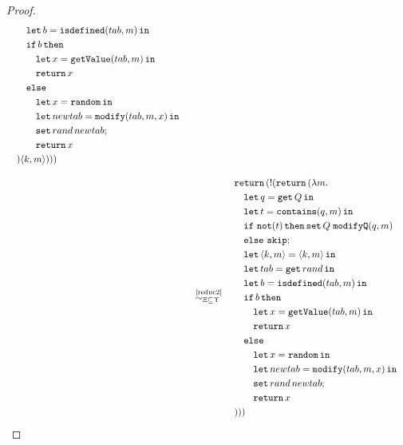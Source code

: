 \begin{proof}
{\begin{align}
\begin{aligned}
        &\quad\quad\letin{b = \mathtt{isdefined}(tab, m)}{} \\
        &\quad\quad\mathtt{if}\, b\, \mathtt{then} \\
        &\quad\quad\quad \letin{x = \mathtt{getValue}(tab, m)}{} \\
        &\quad\quad\quad \return x \\
        &\quad\quad\mathtt{else} \\
        &\quad\quad\quad \letin{x = \random}{} \\
        &\quad\quad\quad \letin{newtab = \mathtt{modify}(tab, m, x)}{} \\
        &\quad\quad\quad \mathtt{set}\,rand\,newtab; \\
        &\quad\quad\quad \return x \\
        &\quad)\lis{k,m})))
    \end{aligned} \nonumber
    \\[2ex]
    &\quad\overset{\text{~\ref{reduc2}}}{\simcontext}\quad
    \begin{aligned}
        &\return(\bang(\return(\lambda m. \\
        &\quad \letin{q=\get Q}{} \\
        &\quad \letin{t=\mathtt{contains}(q,m)}{} \\
        &\quad \mathtt{if}\ \mathtt{not}(t)\,\mathtt{then}\, \mathtt{set}\,Q\;\mathtt{modifyQ}(q,m)\\
        &\quad \mathtt{else}\ \mathtt{skip}; \\
        &\quad\letin{\lis{k,m} = \lis{k,m}}{} \\
        &\quad\letin{tab = \mathtt{get}\,rand}{} \\
        &\quad\letin{b = \mathtt{isdefined}(tab, m)}{} \\
        &\quad\mathtt{if}\, b\, \mathtt{then} \\
        &\quad\quad \letin{x = \mathtt{getValue}(tab, m)}{} \\
        &\quad\quad \return x \\
        &\quad\mathtt{else} \\
        &\quad\quad \letin{x = \random}{} \\
        &\quad\quad \letin{newtab = \mathtt{modify}(tab, m, x)}{} \\
        &\quad\quad \mathtt{set}\,rand\,newtab; \\
        &\quad\quad \return x \\
        &)))
    \end{aligned} \nonumber

\end{align}}
\end{proof}
